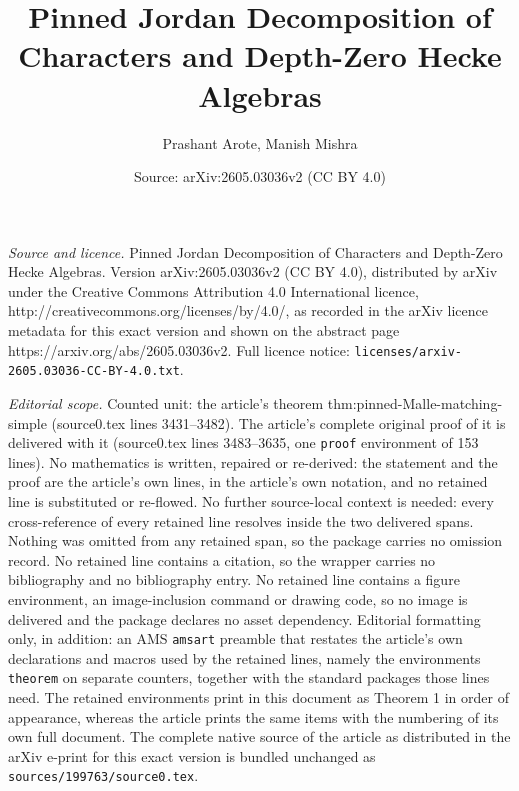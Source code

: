 \documentclass[10pt,a4paper]{amsart}
\title{Pinned Jordan Decomposition of Characters and Depth-Zero Hecke Algebras}
\author{Prashant Arote, Manish Mishra}
\date{Source: arXiv:2605.03036v2 (CC BY 4.0)}
\begin{document}
\maketitle

\noindent\emph{Source and licence.} Pinned Jordan Decomposition of Characters and Depth-Zero Hecke Algebras. Version arXiv:2605.03036v2 (CC BY 4.0), distributed by arXiv under the Creative Commons Attribution 4.0 International licence, http://creativecommons.org/licenses/by/4.0/, as recorded in the arXiv licence metadata for this exact version and shown on the abstract page https://arxiv.org/abs/2605.03036v2. Full licence notice: \texttt{licenses/arxiv-2605.03036-CC-BY-4.0.txt}.\par\smallskip

\noindent\textit{Editorial scope.} Counted unit: the article's theorem thm:pinned-Malle-matching-simple (source0.tex lines 3431--3482). The article's complete original proof of it is delivered with it (source0.tex lines 3483--3635, one \texttt{proof} environment of 153 lines). No mathematics is written, repaired or re-derived: the statement and the proof are the article's own lines, in the article's own notation, and no retained line is substituted or re-flowed.  No further source-local context is needed: every cross-reference of every retained line resolves inside the two delivered spans.  Nothing was omitted from any retained span, so the package carries no omission record.  No retained line contains a citation, so the wrapper carries no bibliography and no bibliography entry.  No retained line contains a figure environment, an image-inclusion command or drawing code, so no image is delivered and the package declares no asset dependency.  Editorial formatting only, in addition: an AMS \texttt{amsart} preamble that restates the article's own declarations and macros used by the retained lines, namely the environments \texttt{theorem} on separate counters, together with the standard packages those lines need.  The retained environments print in this document as Theorem 1 in order of appearance, whereas the article prints the same items with the numbering of its own full document.  The complete native source of the article as distributed in the arXiv e-print for this exact version is bundled unchanged as \texttt{sources/199763/source0.tex}.
\end{document}
